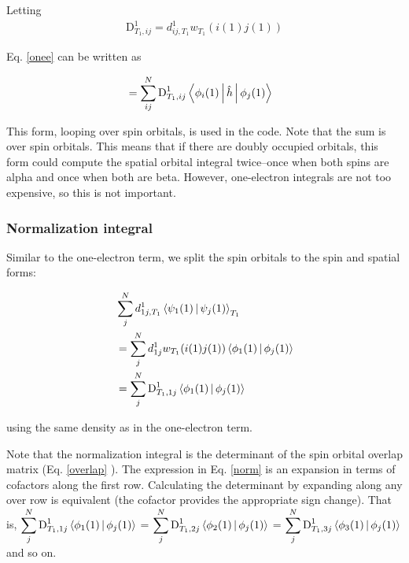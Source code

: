 \documentclass[a4paper]{article}
\begin{document}
Letting 
\begin{equation}
 \begin{aligned}
 	\text{D}_{T_1, ij}^1 = d^1_{ij,T_1}  w_{T_1}( i(1) j(1) )                                                          
     \end{aligned}
     \end{equation}
     
     Eq. \ref{onee} can be written as 
     
 \begin{equation}
 \begin{aligned}                                                                                                                                         
 &=  \displaystyle \sum_{ij}^{N}\text{D}_{T_1, ij}^1 \Braket{ \phi_{i}(1)  | \hat{h}| \phi_{j}(1)  } 
 \label{final_onee}
     \end{aligned}
     \end{equation}

This form, looping over spin orbitals, is used in the code. Note that the sum is over spin orbitals. This means that if there are doubly occupied orbitals, this form could compute the spatial orbital integral twice--once when both spins are alpha and once when both are beta. However, one-electron integrals are not too expensive, so this is not important. 


\subsubsection{Normalization integral}

Similar to the one-electron term, we split the spin orbitals to the spin and spatial forms:

\begin{equation}
 \begin{aligned}
  & \displaystyle \sum_{j}^{N}  d^1_{1j,T_1} \Braket{\psi_1(1) | \psi_j(1)}_{T_1} \\
  &= \displaystyle \sum_{j}^{N}  d^1_{1j} w_{T_1}( i(1) j(1) ) \Braket{\phi_1(1) | \phi_j(1)}\\
  &= \displaystyle \sum_{j}^{N}  \text{D}_{T_1, 1j}^1 \Braket{\phi_1(1) | \phi_j(1)}
 \label{norm}
     \end{aligned}
     \end{equation}
     
 using the same density as in the one-electron term.
 
 Note that the normalization integral is the determinant of the spin orbital overlap matrix (Eq. \ref{overlap} ). The expression in Eq. \ref{norm} is an expansion in terms of cofactors along the first row. Calculating the determinant by expanding along any over row is equivalent (the cofactor provides the appropriate sign change). That is,  $\displaystyle \sum_{j}^{N}  \text{D}_{T_1, 1j}^1 \Braket{\phi_1(1) | \phi_j(1)}$ = $ \displaystyle \sum_{j}^{N}  \text{D}_{T_1, 2j}^1 \Braket{\phi_2(1) | \phi_j(1)}$ = $ \displaystyle\sum_{j}^{N}  \text{D}_{T_1, 3j}^1 \Braket{\phi_3(1) | \phi_j(1)}$ and so on.
     
\end{document}
